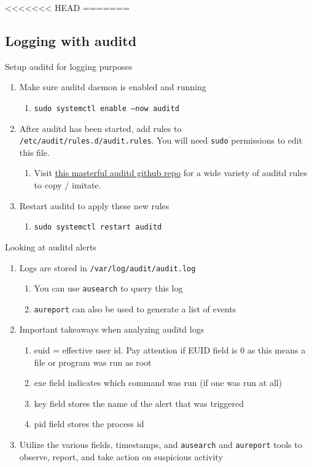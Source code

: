 \documentclass[12pt,letterpaper]{article}
\def\code#1{\textcolor{iris}{\texttt{#1}}}
\begin{document}
<<<<<<< HEAD
=======
\subsection{Logging with auditd}

Setup auditd for logging purposes
\begin{enumerate}
	\item Make sure auditd daemon is enabled and running
		\begin{enumerate}
			\item \code{sudo systemctl enable --now auditd}
		\end{enumerate}
	\item After auditd has been started, add rules to \code{/etc/audit/rules.d/audit.rules}. You will need \code{sudo} permissions to edit this file.
		\begin{enumerate}
			\item Visit \href{https://github.com/Neo23x0/auditd/blob/master/audit.rules}{this masterful auditd github repo} for a wide variety of auditd rules to copy / imitate.
		\end{enumerate}
	\item Restart auditd to apply these new rules
		\begin{enumerate}
			\item \code{sudo systemctl restart auditd}
		\end{enumerate}
\end{enumerate}

Looking at auditd alerts
\begin{enumerate}
	\item Logs are stored in \code{/var/log/audit/audit.log}
		\begin{enumerate}
			\item You can use \code{ausearch} to query this log
			\item \code{aureport} can also be used to generate a list of events
		\end{enumerate}
	\item Important takeaways when analyzing auditd logs
		\begin{enumerate}
			\item euid = effective user id. Pay attention if EUID field is 0 as this means a file or program was run as root
			\item exe field indicates which command was run (if one was run at all)
			\item key field stores the name of the alert that was triggered
			\item pid field stores the process id
		\end{enumerate}
	\item Utilize the various fields, timestamps, and \code{ausearch} and \code{aureport} tools to observe, report, and take action on suspicious activity
\end{enumerate}
\end{document}
